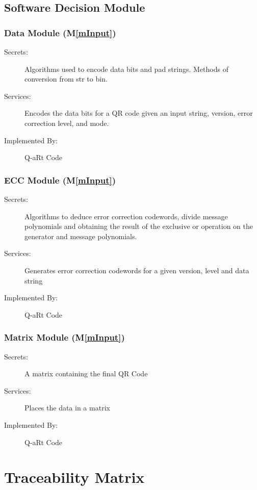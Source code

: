 \documentclass[12pt, titlepage]{article}
\newcommand{\mref}[1]{M\ref{#1}}
\begin{document}
\subsection{Software Decision Module}

\subsubsection{Data Module (\mref{mInput})}

\begin{description}
\item[Secrets:] Algorithms used to  encode data bits and pad strings. Methods of conversion from str to bin.
\item[Services:] Encodes the data bits for a QR code given an input string, version, error correction level, and mode.
\item[Implemented By:] Q-aRt Code
\end{description}

\subsubsection{ECC Module (\mref{mInput})}

\begin{description}
\item[Secrets:] Algorithms to deduce error correction codewords, divide message polynomials and obtaining the result of the exclusive or operation on the generator and message polynomials.
\item[Services:] Generates error correction codewords for a given version, level and data string
\item[Implemented By:] Q-aRt Code
\end{description}

\subsubsection{Matrix Module (\mref{mInput})}

\begin{description}
\item[Secrets:] A matrix containing the final QR Code
\item[Services:] Places the data in a matrix
\item[Implemented By:] Q-aRt Code
\end{description}

\section{Traceability Matrix} \label{SecTM}
\end{document}
